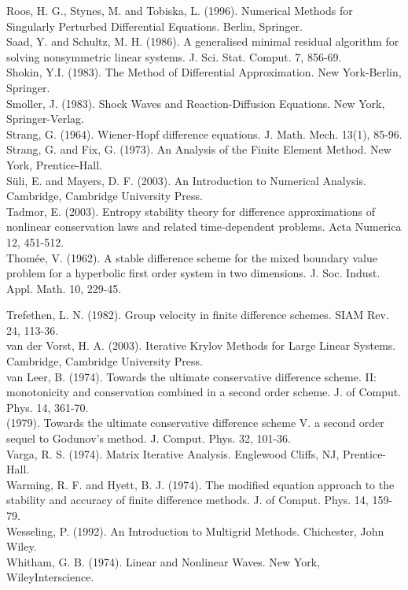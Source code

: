 \documentclass[10pt]{article}
\begin{document}
Roos, H. G., Stynes, M. and Tobiska, L. (1996). Numerical Methods for Singularly Perturbed Differential Equations. Berlin, Springer.\\
Saad, Y. and Schultz, M. H. (1986). A generalised minimal residual algorithm for solving nonsymmetric linear systems. J. Sci. Stat. Comput. 7, 856-69.\\
Shokin, Y.I. (1983). The Method of Differential Approximation. New York-Berlin, Springer.\\
Smoller, J. (1983). Shock Waves and Reaction-Diffusion Equations. New York, Springer-Verlag.\\
Strang, G. (1964). Wiener-Hopf difference equations. J. Math. Mech. 13(1), 85-96.\\
Strang, G. and Fix, G. (1973). An Analysis of the Finite Element Method. New York, Prentice-Hall.\\
Süli, E. and Mayers, D. F. (2003). An Introduction to Numerical Analysis. Cambridge, Cambridge University Press.\\
Tadmor, E. (2003). Entropy stability theory for difference approximations of nonlinear conservation laws and related time-dependent problems. Acta Numerica 12, 451-512.\\
Thomée, V. (1962). A stable difference scheme for the mixed boundary value problem for a hyperbolic first order system in two dimensions. J. Soc. Indust. Appl. Math. 10, 229-45.

Trefethen, L. N. (1982). Group velocity in finite difference schemes. SIAM Rev. 24, 113-36.\\
van der Vorst, H. A. (2003). Iterative Krylov Methods for Large Linear Systems. Cambridge, Cambridge University Press.\\
van Leer, B. (1974). Towards the ultimate conservative difference scheme. II: monotonicity and conservation combined in a second order scheme. J. of Comput. Phys. 14, 361-70.\\
(1979). Towards the ultimate conservative difference scheme V. a second order sequel to Godunov's method. J. Comput. Phys. 32, 101-36.\\
Varga, R. S. (1974). Matrix Iterative Analysis. Englewood Cliffs, NJ, Prentice-Hall.\\
Warming, R. F. and Hyett, B. J. (1974). The modified equation approach to the stability and accuracy of finite difference methods. J. of Comput. Phys. 14, 159-79.\\
Wesseling, P. (1992). An Introduction to Multigrid Methods. Chichester, John Wiley.\\
Whitham, G. B. (1974). Linear and Nonlinear Waves. New York, WileyInterscience.
\end{document}
